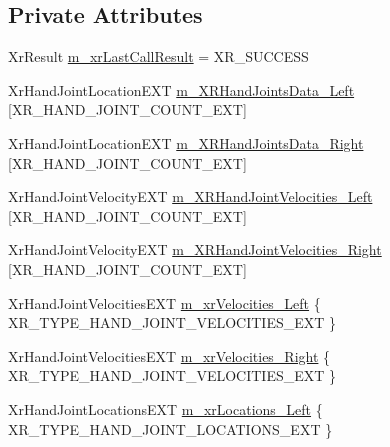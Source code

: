 \subsection*{Private Attributes}
\begin{DoxyCompactItemize}
\item 
Xr\+Result \mbox{\hyperlink{class_open_x_r_provider_1_1_x_r_ext_hand_tracking_a3ca093c9b4e0583098c44f5af6ba91ea}{m\+\_\+xr\+Last\+Call\+Result}} = X\+R\+\_\+\+S\+U\+C\+C\+E\+SS
\item 
Xr\+Hand\+Joint\+Location\+E\+XT \mbox{\hyperlink{class_open_x_r_provider_1_1_x_r_ext_hand_tracking_a0132ecc3194aba8f802b61aabb2f85f0}{m\+\_\+\+X\+R\+Hand\+Joints\+Data\+\_\+\+Left}} \mbox{[}X\+R\+\_\+\+H\+A\+N\+D\+\_\+\+J\+O\+I\+N\+T\+\_\+\+C\+O\+U\+N\+T\+\_\+\+E\+XT\mbox{]}
\item 
Xr\+Hand\+Joint\+Location\+E\+XT \mbox{\hyperlink{class_open_x_r_provider_1_1_x_r_ext_hand_tracking_a264f64fc45e0b93b877b22313acfd3eb}{m\+\_\+\+X\+R\+Hand\+Joints\+Data\+\_\+\+Right}} \mbox{[}X\+R\+\_\+\+H\+A\+N\+D\+\_\+\+J\+O\+I\+N\+T\+\_\+\+C\+O\+U\+N\+T\+\_\+\+E\+XT\mbox{]}
\item 
Xr\+Hand\+Joint\+Velocity\+E\+XT \mbox{\hyperlink{class_open_x_r_provider_1_1_x_r_ext_hand_tracking_a1f213ff768ffa3fc790edc132ab39039}{m\+\_\+\+X\+R\+Hand\+Joint\+Velocities\+\_\+\+Left}} \mbox{[}X\+R\+\_\+\+H\+A\+N\+D\+\_\+\+J\+O\+I\+N\+T\+\_\+\+C\+O\+U\+N\+T\+\_\+\+E\+XT\mbox{]}
\item 
Xr\+Hand\+Joint\+Velocity\+E\+XT \mbox{\hyperlink{class_open_x_r_provider_1_1_x_r_ext_hand_tracking_a9cf1f1a23aaad6e2d6ab18adddc74534}{m\+\_\+\+X\+R\+Hand\+Joint\+Velocities\+\_\+\+Right}} \mbox{[}X\+R\+\_\+\+H\+A\+N\+D\+\_\+\+J\+O\+I\+N\+T\+\_\+\+C\+O\+U\+N\+T\+\_\+\+E\+XT\mbox{]}
\item 
Xr\+Hand\+Joint\+Velocities\+E\+XT \mbox{\hyperlink{class_open_x_r_provider_1_1_x_r_ext_hand_tracking_a059e491f76ecfcf17fd4987a3d83921c}{m\+\_\+xr\+Velocities\+\_\+\+Left}} \{ X\+R\+\_\+\+T\+Y\+P\+E\+\_\+\+H\+A\+N\+D\+\_\+\+J\+O\+I\+N\+T\+\_\+\+V\+E\+L\+O\+C\+I\+T\+I\+E\+S\+\_\+\+E\+XT \}
\item 
Xr\+Hand\+Joint\+Velocities\+E\+XT \mbox{\hyperlink{class_open_x_r_provider_1_1_x_r_ext_hand_tracking_adce3da1f63b9cc8b78616b9c0746c1b1}{m\+\_\+xr\+Velocities\+\_\+\+Right}} \{ X\+R\+\_\+\+T\+Y\+P\+E\+\_\+\+H\+A\+N\+D\+\_\+\+J\+O\+I\+N\+T\+\_\+\+V\+E\+L\+O\+C\+I\+T\+I\+E\+S\+\_\+\+E\+XT \}
\item 
Xr\+Hand\+Joint\+Locations\+E\+XT \mbox{\hyperlink{class_open_x_r_provider_1_1_x_r_ext_hand_tracking_a7c2498356df6fa9eaca23457ccff5ed7}{m\+\_\+xr\+Locations\+\_\+\+Left}} \{ X\+R\+\_\+\+T\+Y\+P\+E\+\_\+\+H\+A\+N\+D\+\_\+\+J\+O\+I\+N\+T\+\_\+\+L\+O\+C\+A\+T\+I\+O\+N\+S\+\_\+\+E\+XT \}

\end{DoxyCompactItemize}
